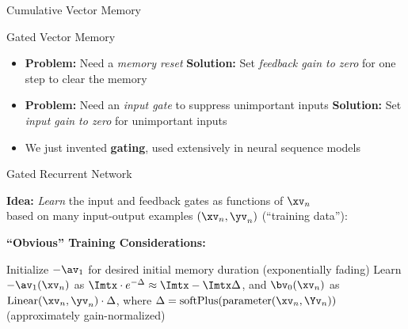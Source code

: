 \begin{slide}[\slideopts,toc={Vector Memory}]{Cumulative Vector Memory}
\vspace{-1em}
\vspace{-1em}
\end{slide}

\begin{slide}[\slideopts,toc={Gating}]{Gated Vector Memory}


\begin{itemize}
\item \textbf{Problem:} Need a \emph{memory reset}
\mpitem \textbf{Solution:} Set \emph{feedback gain to zero} for one step to clear the memory
\item[]
\mpitem \textbf{Problem:} Need an \emph{input gate} to suppress unimportant inputs
\mpitem \textbf{Solution:} Set \emph{input gain to zero} for unimportant inputs
\item[]
\mpitem We just invented \textbf{gating}, used extensively in neural sequence models
\end{itemize}

\end{slide}

\begin{slide}[\slideopts,toc={Gated RNN}]{Gated Recurrent Network}

\vspace{-1em}

  \textbf{Idea:} \emph{Learn} the input and feedback gates as functions of $\xv_n$\\
  based on many input-output examples $(\xv_n,\yv_n)$ (``training data''):

\vspace{-1em}


\maybepause

\textbf{``Obvious'' Training Considerations:}
\begin{itemize}
\mpitem Initialize $-\av_1$ for desired initial memory duration (exponentially fading)
\mpitem Learn $-\av_1(\xv_n)$ as $\Imtx\cdot e^{-\Delta}\approx \Imtx -\Imtx \Delta$, and $\bv_0(\xv_n)$ as $\mbox{Linear}(\xv_n,\yv_n)\cdot\Delta$, where
$\Delta = \mbox{softPlus}(\mbox{parameter}(\xv_n,\Yv_n))$ (approximately gain-normalized)
\end{itemize}

\end{slide}

